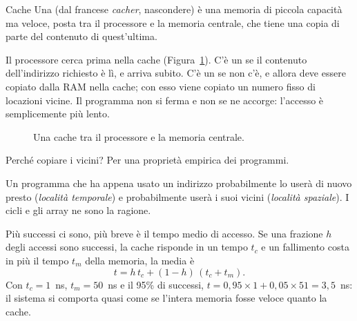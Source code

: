 \begin{definition}{Cache}
Una  (dal francese \emph{cacher}, nascondere) è una memoria di
piccola capacità ma veloce, posta tra il processore e la memoria centrale, che
tiene una copia di parte del contenuto di quest'ultima.
\end{definition}

Il processore cerca prima nella cache (Figura~\ref{fig:st:cache}). C'è un
  se il contenuto dell'indirizzo richiesto è lì, e
arriva subito. C'è un   se non c'è, e allora deve
essere copiato dalla RAM nella cache; con esso viene copiato un numero fisso
di locazioni vicine. Il programma non si ferma e non se ne accorge: l'accesso
è semplicemente più lento.

\begin{figure}[htb]
\centering
{}
\caption{Una cache tra il processore e la memoria centrale.}
\label{fig:st:cache}
\end{figure}

Perché copiare i vicini? Per una proprietà empirica dei programmi.

\begin{prgconcept}
Un programma che ha appena usato un indirizzo probabilmente lo userà di nuovo
presto (\emph{località temporale}) e probabilmente userà i suoi vicini
(\emph{località spaziale}). I cicli e gli array ne sono la ragione.
\end{prgconcept}

Più successi ci sono, più breve è il tempo medio di accesso. Se una frazione
$h$ degli accessi sono successi, la cache risponde in un tempo $t_c$ e un
fallimento costa in più il tempo $t_m$ della memoria, la media è
\[ t = h\,t_c+(1-h)\,(t_c+t_m). \]
Con $t_c=1$~ns, $t_m=50$~ns e il 95\% di successi,
$t=0,95\times 1+0,05\times 51=3,5$~ns: il sistema si comporta quasi come se
l'intera memoria fosse veloce quanto la cache.

